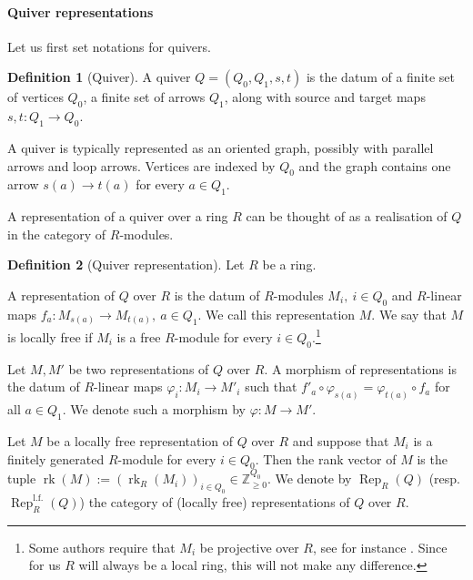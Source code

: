 \documentclass[11pt,english]{article}
\numberwithin{equation}{section}
\numberwithin{figure}{section}
\theoremstyle{definition}
\newtheorem{df}{Definition}[subsection]
\theoremstyle{plain}
\theoremstyle{remark}
\DeclareMathOperator{\rk}{rk}
\DeclareMathOperator{\Rep}{Rep}
\newcommand\ZZ{\mathbb{Z}}
\begin{document}
\paragraph*{Quiver representations}

Let us first set notations for quivers.

\begin{df}[Quiver] 

A quiver $Q=(Q_{0},Q_{1},s,t)$ is the datum of a finite set of vertices
$Q_{0}$, a finite set of arrows $Q_{1}$, along with source and target
maps $s,t:Q_{1}\rightarrow Q_{0}$.

\end{df}

A quiver is typically represented as an oriented graph, possibly with
parallel arrows and loop arrows. Vertices are indexed by $Q_{0}$
and the graph contains one arrow $s(a)\rightarrow t(a)$ for every
$a\in Q_{1}$.

A representation of a quiver over a ring $R$ can be thought of as
a realisation of $Q$ in the category of $R$-modules.

\begin{df}[Quiver representation]

Let $R$ be a ring.

A representation of $Q$ over $R$ is the datum of $R$-modules $M_{i},\ i\in Q_{0}$
and $R$-linear maps $f_{a}:M_{s(a)}\rightarrow M_{t(a)},\ a\in Q_{1}$.
We call this representation $M$. We say that $M$ is locally free
if $M_{i}$ is a free $R$-module for every $i\in Q_{0}$.\footnote{Some authors require that $M_{i}$ be projective over $R$, see for
instance \cite{Sch92}. Since for us $R$ will always be a local ring,
this will not make any difference.}

Let $M,M'$ be two representations of $Q$ over $R$. A morphism of
representations is the datum of $R$-linear maps $\varphi_{i}:M_{i}\rightarrow M'_{i}$
such that $f'_{a}\circ\varphi_{s(a)}=\varphi_{t(a)}\circ f_{a}$ for
all $a\in Q_{1}$. We denote such a morphism by $\varphi:M\rightarrow M'$.

Let $M$ be a locally free representation of $Q$ over $R$ and suppose
that $M_{i}$ is a finitely generated $R$-module for every $i\in Q_{0}$.
Then the rank vector of $M$ is the tuple $\rk(M):=(\rk_{R}(M_{i}))_{i\in Q_{0}}\in\ZZ_{\geq0}^{Q_{0}}$.
We denote by $\Rep_{R}(Q)$ (resp. $\Rep_{R}^{\mathrm{l.f.}}(Q)$)
the category of (locally free) representations of $Q$ over $R$.

\end{df}
\end{document}
